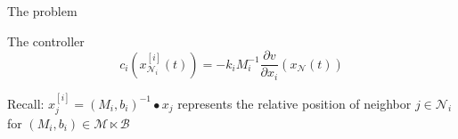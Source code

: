 \documentclass{beamer}
\begin{document}
\begin{frame}{The problem}
	
	\begin{block}{The controller}	
		\begin{equation*}
			c_i\left(x^{[i]}_{\mathcal{N}_i}(t)\right) = -k_iM_i^{-1}\frac{\partial v}{\partial x_i}\left(x_{\mathcal{N}}(t)\right)
		\end{equation*}
	\end{block}
	\begin{alertblock}{Recall:}
		$x_j^{[i]} = (M_i,b_i)^{-1}\bullet x_j $ represents the relative position of neighbor $j\in \mathcal{N}_i$ for $(M_i,b_i) \in \mathcal{M}\ltimes \mathcal{B}$ 
	\end{alertblock}
\end{frame}
\end{document}
